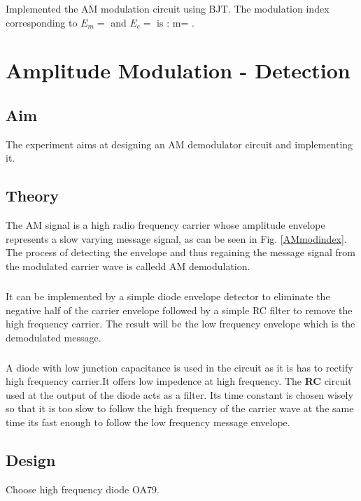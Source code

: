\documentclass{book}
\begin{document}
Implemented the AM modulation circuit using BJT.
The modulation index corresponding to $E_m=$ \textemdash \textemdash and $E_c=$ \textemdash\textemdash is : m= \textemdash\textemdash .






\chapter[Amplitude Modulation - Detection]{Amplitude Modulation - Detection}

\section*{Aim}
The experiment aims at designing an AM demodulator circuit and implementing it.

\section*{Theory}
The AM signal is a high radio frequency carrier whose amplitude envelope represents a slow varying message signal, as can be seen in Fig. \ref{AMmodindex}. The process of detecting the envelope and thus regaining the message signal from the modulated carrier wave is calledd AM demodulation.
\paragraph{}
It can be implemented by a simple diode envelope detector to eliminate the negative half of the carrier envelope followed by a simple RC filter to remove the high frequency carrier. The result will be the low frequency envelope which is the demodulated message.
\paragraph{}
A diode with low junction capacitance is used in the circuit as it is has to rectify high frequency carrier.It offers low impedence at high frequency. The \textbf{RC} circuit used at the output of the diode acts as a filter. Its time constant is chosen wisely so that it is too slow to follow the high frequency of the carrier wave at the same time its fast enough to follow the low frequency message envelope. 


\section*{Design}
Choose high frequency diode OA79.
\end{document}
